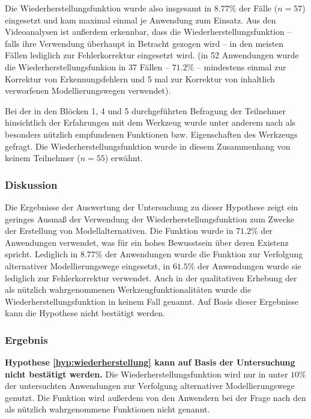 Die Wiederherstellungsfunktion wurde also insgesamt in $8.77\%$ der Fälle ($n=57$) eingesetzt und kam maximal einmal je Anwendung zum Einsatz.  Aus den Videoanalysen ist außerdem erkennbar, dass die Wiederherstellungsfunktion -- falls ihre Verwendung überhaupt in Betracht gezogen wird -- in den meisten Fällen lediglich zur Fehlerkorrektur eingesetzt wird. (in 52 Anwendungen wurde die Wiederherstellungsfunkion in 37 Fällen -- $71.2\%$ -- mindestens einmal zur Korrektur von Erkennungsfehlern und 5 mal zur Korrektur von inhaltlich verworfenen Modellierungswegen verwendet).

Bei der in den Blöcken 1, 4 und 5 durchgeführten Befragung der Teilnehmer hinsichtlich der Erfahrungen mit dem Werkzeug wurde unter anderem nach als besonders nützlich empfundenen Funktionen bzw. Eigenschaften des Werkzeugs gefragt. Die Wiederherstellungsfunktion wurde in diesem Zusammenhang von keinem Teilnehmer ($n=55$) erwähnt. 

\subsubsection{Diskussion} 

Die Ergebnisse der Auswertung der Untersuchung zu dieser Hypothese zeigt ein geringes Ausmaß der Verwendung der Wiederherstellungsfunktion zum Zwecke der Erstellung von Modellalternativen. Die Funktion wurde in $71.2\%$ der Anwendungen verwendet, was für ein hohes Bewusstsein über deren Existenz spricht. Lediglich in $8.77\%$ der Anwendungen wurde die Funktion zur Verfolgung alternativer Modellierungswege eingesetzt, in $61.5\%$ der Anwendungen wurde sie lediglich zur Fehlerkorrektur verwendet. Auch in der qualitativen Erhebung der als nützlich wahrgenommenen Werkzeugfunktionalitäten wurde die Wiederherstellungsfunktion in keinem Fall genannt. Auf Basis dieser Ergebnisse kann die Hypothese nicht bestätigt werden. 

\subsubsection{Ergebnis} 

\textbf{Hypothese \ref{hyp:wiederherstellung} kann auf Basis der Untersuchung nicht bestätigt werden.} Die Wiederherstellungsfunktion wird nur in unter $10\%$ der untersuchten Anwendungen  zur Verfolgung alternativer Modellierungswege genutzt. Die Funktion wird außerdem von den Anwendern bei der Frage nach den als nützlich wahrgenommene Funktionen nicht genannt.

